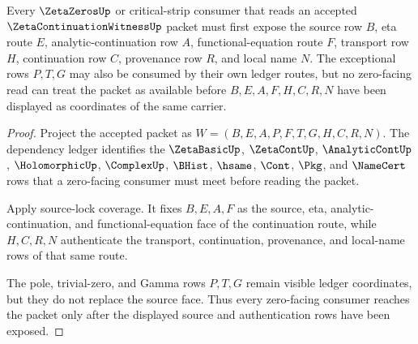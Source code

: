 \begin{theorem}
\label{thm:zeta-continuation-witness-zero-facing-source-totality}
Every $\ZetaZerosUp$ or critical-strip consumer that reads an accepted $\ZetaContinuationWitnessUp$ packet must first expose the source row $B$, eta route $E$, analytic-continuation row $A$, functional-equation route $F$, transport row $H$, continuation row $C$, provenance row $R$, and local name $N$. The exceptional rows $P,T,G$ may also be consumed by their own ledger routes, but no zero-facing read can treat the packet as available before $B,E,A,F,H,C,R,N$ have been displayed as coordinates of the same carrier.
\end{theorem}
\begin{proof}
Project the accepted packet as $W=(B,E,A,P,F,T,G,H,C,R,N)$. The dependency ledger identifies the $\ZetaBasicUp$, $\ZetaContUp$, $\AnalyticContUp$, $\HolomorphicUp$, $\ComplexUp$, $\BHist$, $\hsame$, $\Cont$, $\Pkg$, and $\NameCert$ rows that a zero-facing consumer must meet before reading the packet.

Apply source-lock coverage. It fixes $B,E,A,F$ as the source, eta, analytic-continuation, and functional-equation face of the continuation route, while $H,C,R,N$ authenticate the transport, continuation, provenance, and local-name rows of that same route.

The pole, trivial-zero, and Gamma rows $P,T,G$ remain visible ledger coordinates, but they do not replace the source face. Thus every zero-facing consumer reaches the packet only after the displayed source and authentication rows have been exposed.
\end{proof}

